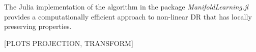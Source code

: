 \documentclass[journal, a4paper]{IEEEtran}
\begin{document}
%



The Julia implementation of the algorithm in the package \textit{ManifoldLearning.jl} provides a computationally efficient approach to non-linear DR that has locally preserving properties.

[PLOTS PROJECTION, TRANSFORM]




\end{document}
